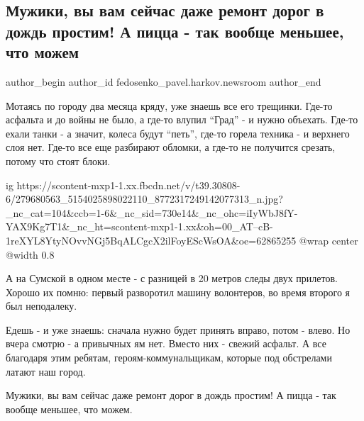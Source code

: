  
 
 
 
 
 
\subsection{Мужики, вы вам сейчас даже ремонт дорог в дождь простим! А пицца - так вообще меньшее, что можем}
\label{sec:30_04_2022.fb.fedosenko_pavel.harkov.newsroom.1.kommunalschiki}
 
\ifcmt
 author_begin
   author_id fedosenko_pavel.harkov.newsroom
 author_end
\fi


Мотаясь по городу два месяца кряду, уже знаешь все его трещинки. Где-то
асфальта и до войны не было, а где-то влупил \enquote{Град} - и нужно объехать. Где-то
ехали танки - а значит, колеса будут \enquote{петь}, где-то горела техника - и верхнего
слоя нет. Где-то все еще разбирают обломки, а где-то не получится срезать,
потому что стоят блоки.

\ifcmt
  ig https://scontent-mxp1-1.xx.fbcdn.net/v/t39.30808-6/279680563_5154025898022110_8772317249142077313_n.jpg?_nc_cat=104&ccb=1-6&_nc_sid=730e14&_nc_ohc=iIyWbJ8fY-YAX9Kg7T1&_nc_ht=scontent-mxp1-1.xx&oh=00_AT--cB-1reXYL8YtyNOvvNGj5BqALCgcX2ilFoyEScWsOA&oe=62865255
  @wrap center
  @width 0.8
\fi

А на Сумской в одном месте - с разницей в 20 метров следы двух прилетов. Хорошо
их помню: первый разворотил машину волонтеров, во время второго я был
неподалеку. 

Едешь - и уже знаешь: сначала нужно будет принять вправо, потом - влево. Но
вчера смотрю - а привычных ям нет. Вместо них - свежий асфальт. А все благодаря
этим ребятам, героям-коммунальщикам, которые под обстрелами латают наш город. 

Мужики, вы вам сейчас даже ремонт дорог в дождь простим! А пицца - так вообще
меньшее, что можем.


